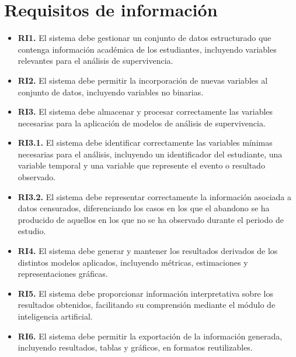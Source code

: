 \section{Requisitos de información}
\begin{itemize}
    \item \textbf{RI1.} El sistema debe gestionar un conjunto de datos estructurado que contenga información académica de los estudiantes, incluyendo variables relevantes para el análisis de supervivencia.
    
    \item \textbf{RI2.} El sistema debe permitir la incorporación de nuevas variables al conjunto de datos, incluyendo variables no binarias.
    
    \item \textbf{RI3.} El sistema debe almacenar y procesar correctamente las variables necesarias para la aplicación de modelos de análisis de supervivencia.
    
    \item \textbf{RI3.1.} El sistema debe identificar correctamente las variables mínimas necesarias para el análisis, incluyendo un identificador del estudiante, una variable temporal y una variable que represente el evento o resultado observado.
    
    \item \textbf{RI3.2.} El sistema debe representar correctamente la información asociada a datos censurados, diferenciando los casos en los que el abandono se ha producido de aquellos en los que no se ha observado durante el periodo de estudio.
    
    \item \textbf{RI4.} El sistema debe generar y mantener los resultados derivados de los distintos modelos aplicados, incluyendo métricas, estimaciones y representaciones gráficas.
    
    \item \textbf{RI5.} El sistema debe proporcionar información interpretativa sobre los resultados obtenidos, facilitando su comprensión mediante el módulo de inteligencia artificial.
    
    \item \textbf{RI6.} El sistema debe permitir la exportación de la información generada, incluyendo resultados, tablas y gráficos, en formatos reutilizables.
\end{itemize}
